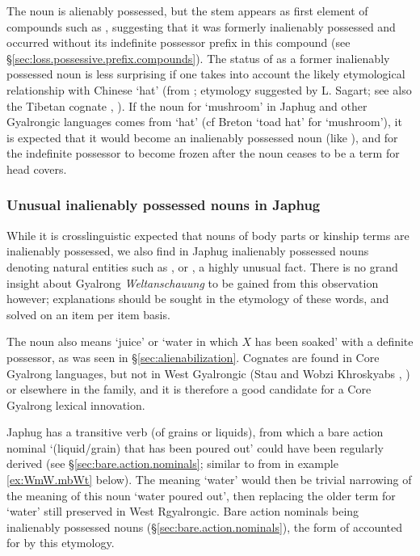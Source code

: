 The noun  is alienably possessed, but the stem  appears as first element of compounds such as , suggesting that it was formerly inalienably possessed and occurred without its indefinite possessor prefix in this compound (see §\ref{sec:loss.possessive.prefix.compounds}). The status of  as a former inalienably possessed noun is less surprising if one takes into account the likely etymological relationship with Chinese   `hat' (from ; etymology suggested by L. Sagart; see also the Tibetan cognate , \citealt{zhangsy19cognates}). If the noun for `mushroom' in Japhug and other Gyalrongic languages comes from `hat' (cf Breton  `toad hat' for `mushroom'), it is expected that it would become an inalienably possessed noun (like ), and for the indefinite possessor  to become frozen after the noun ceases to be a term for head covers.
 
\subsubsection{Unusual inalienably possessed nouns in Japhug} \label{sec:earth.IPN}
While it is crosslinguistic expected that nouns of body parts or kinship terms are inalienably possessed, we also find in Japhug inalienably possessed nouns denoting natural entities such as ,  or , a highly unusual fact. There is no grand insight about Gyalrong \textit{Weltanschauung} to be gained from this observation however; explanations should be sought in the etymology of these words, and solved on an item per item basis. 

The noun  also means `juice' or `water in which $X$ has been soaked' with a definite possessor, as was seen in §\ref{sec:alienabilization}. Cognates are found in Core Gyalrong languages, but not in West Gyalrongic (Stau  and Wobzi Khroskyabs , \citealt[610]{jacques17stau}) or elsewhere in the family, and it is therefore a good candidate for a Core Gyalrong lexical innovation. 

Japhug has a transitive verb  (of grains or liquids), from which a bare action nominal  `(liquid/grain) that has been poured out' could have been regularly derived (see §\ref{sec:bare.action.nominals}; similar to  from  in example \ref{ex:WmW.mbWt} below). The meaning `water' would then be trivial narrowing of the meaning of this noun `water poured out', then replacing the older term for `water' still preserved in West Rgyalrongic. Bare action nominals being inalienably possessed nouns (§\ref{sec:bare.action.nominals}), the form of  accounted for by this etymology.

